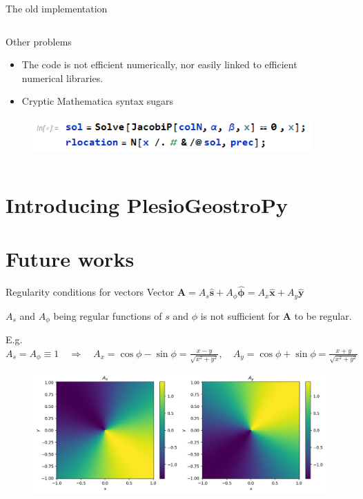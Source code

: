 \documentclass[11pt,aspectratio=169]{beamer}
\begin{document}
\begin{frame}{The old implementation}
	\begin{columns}
	\begin{column}{.46\linewidth}
		Other problems
		\begin{itemize}
			\item The code is not efficient numerically, nor easily linked to efficient numerical libraries.
			\item Cryptic Mathematica syntax sugars
		\end{itemize}
		\begin{figure}
			\centering
			\includegraphics[width=.8\linewidth]{elements/Mathematica_snippet_3.png}
		\end{figure}
	\end{column}
	\begin{column}{.46\linewidth}
	\end{column}
	\end{columns}
\end{frame}

\section{Introducing PlesioGeostroPy}
\begin{frame}
    
\end{frame}

\section{Future works}

\begin{frame}{Regularity conditions for vectors}
	Vector $\mathbf{A} = A_s \hat{\mathbf{s}} + A_\phi \hat{\bm{\phi}} = A_x \hat{\mathbf{x}} + A_y \hat{\mathbf{y}}$

	$A_s$ and $A_\phi$ being regular functions of $s$ and $\phi$ is not sufficient for $\mathbf{A}$ to be regular.
	\vspace{1em}

	E.g. $A_s = A_\phi \equiv 1 \quad \Longrightarrow \quad A_x = \cos\phi - \sin\phi = \frac{x - y}{\sqrt{x^2 + y^2}},\quad A_y = \cos\phi + \sin\phi = \frac{x + y}{\sqrt{x^2 + y^2}}$

	\begin{figure}
		\centering
		\includegraphics[width=.75\linewidth]{./elements/singular_field.png}
	\end{figure}
\end{frame}
\end{document}
